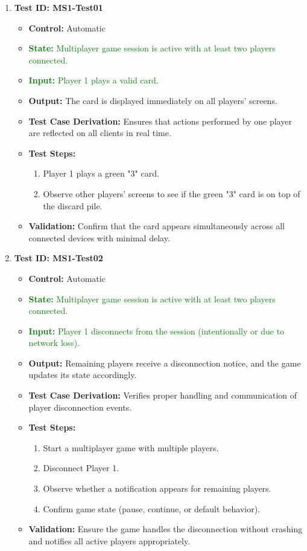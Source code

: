 \documentclass[12pt]{article}
\newcommand{\added}[1]{\textcolor{green}{#1}}
\begin{document}
\begin{enumerate}
    \item \textbf{Test ID: MS1-Test01}
    \begin{itemize}
        \item \textbf{Control:} Automatic
        \item \added{\textbf{State:} Multiplayer game session is active with at least two players connected.}
        \item \added{\textbf{Input:} Player 1 plays a valid card.}
        \item \textbf{Output:} The card is displayed immediately on all players’ screens.
        \item \textbf{Test Case Derivation:} Ensures that actions performed by one player are reflected on all clients in real time.
        \item \textbf{Test Steps:}
        \begin{enumerate}
            \item Player 1 plays a green "3" card.
            \item Observe other players’ screens to see if the green "3" card is on top of the discard pile.
        \end{enumerate}
        \item \textbf{Validation:} Confirm that the card appears simultaneously across all connected devices with minimal delay.
    \end{itemize}

    \item \textbf{Test ID: MS1-Test02}
    \begin{itemize}
        \item \textbf{Control:} Automatic
        \item \added{\textbf{State:} Multiplayer game session is active with at least two players connected.}
        \item \added{\textbf{Input:} Player 1 disconnects from the session (intentionally or due to network loss).}
        \item \textbf{Output:} Remaining players receive a disconnection notice, and the game updates its state accordingly.
        \item \textbf{Test Case Derivation:} Verifies proper handling and communication of player disconnection events.
        \item \textbf{Test Steps:}
        \begin{enumerate}
            \item Start a multiplayer game with multiple players.
            \item Disconnect Player 1.
            \item Observe whether a notification appears for remaining players.
            \item Confirm game state (pause, continue, or default behavior).
        \end{enumerate}
        \item \textbf{Validation:} Ensure the game handles the disconnection without crashing and notifies all active players appropriately.
    \end{itemize}
\end{enumerate}
\end{document}
